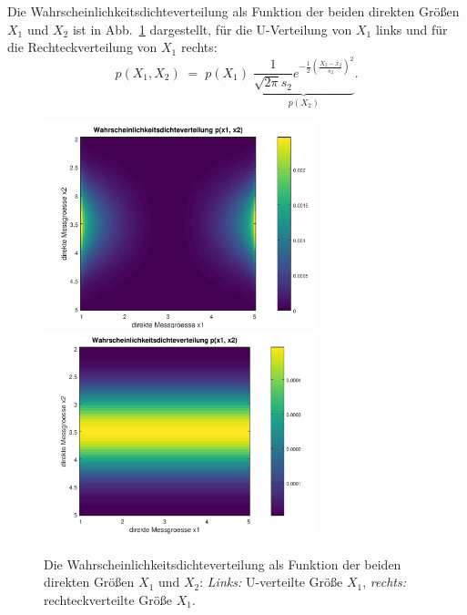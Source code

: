 Die Wahrscheinlichkeitsdichteverteilung als Funktion der beiden direkten Größen $X_1$
und $X_2$ ist in Abb.~\ref{pdfx1x2} dargestellt, für die U-Verteilung von $X_1$ links
und für die Rechteckverteilung von $X_1$ rechts:
\begin{equation}
p(X_1, X_2) \; = \; p(X_1) \; \underbrace{\frac{1}{\sqrt{2\pi} s_2} 
	e^{-\frac{1}{2}\left(\frac{X_2 - \bar x_2}{s_2}\right)^2} }_{p(X_2)}.
\end{equation}
\begin{figure}
	\begin{center}
		\includegraphics[width=80mm]{10_vorlesung/media/direkte_x1_x2.png}
		\hspace{2mm}
		\includegraphics[width=80mm]{10_vorlesung/media/direkte_x1_x2_box.png}
		\caption{Die Wahrscheinlichkeitsdichteverteilung als Funktion der beiden direkten Größen $X_1$
			und $X_2$: \textsl{Links:} U-verteilte Größe $X_1$,
			\textsl{rechts:} rechteckverteilte Größe $X_1$.}
		\label{pdfx1x2}
	\end{center}
\end{figure}


